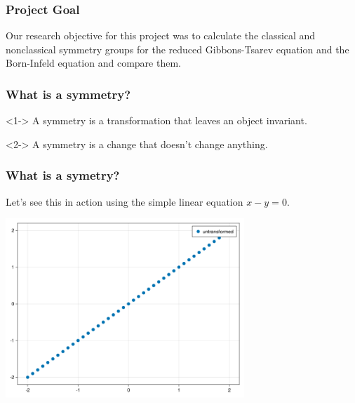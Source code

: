 \documentclass{beamer}
\begin{document}
\begin{frame}
    \frametitle{Project Goal}
    Our research objective for this project was to calculate the classical and nonclassical symmetry groups for the reduced Gibbons-Tsarev equation and the Born-Infeld equation and compare them.
\end{frame}



\begin{frame}
    \frametitle{What is a symmetry?}
    \begin{definition}<1->
        A symmetry is a transformation that leaves an object invariant.
    \end{definition}
    \vspace*{0.5in}
    \begin{definition}<2->
        A symmetry is a change that doesn't change anything.
    \end{definition}
\end{frame}


\begin{frame}
    \frametitle{What is a symetry?}
    Let's see this in action using the simple linear equation $x-y=0$.\\
    \begin{center}
        \includegraphics[width=9cm]{y=x.png}
    \end{center}
\end{frame}
\end{document}
